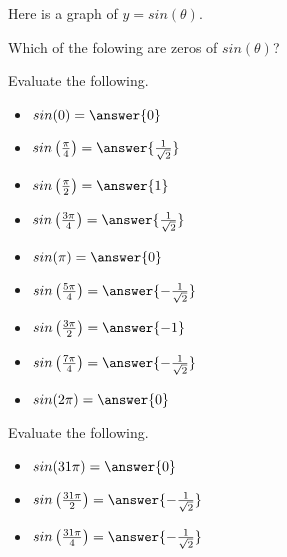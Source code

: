 \documentclass{ximera}
\author{Lee Wayand}
\begin{document}
Here is a graph of $y = sin(\theta)$.
\begin{center}
\end{center}




\begin{exercise} Which of the folowing are zeros of $sin(\theta)$? 

\begin{selectAll}
\choice [correct]{$-3\pi$}
\choice [correct]{$-2\pi$}
\choice [correct]{$-\pi$}
\choice [correct]{$\pi$}
\choice [correct]{$2\pi$}
\choice [correct]{$3\pi$}
\end{selectAll}


\end{exercise}




\begin{exercise} Evaluate the following.

\begin{itemize}
\item $sin(0) = \answer{0}$
\item $sin\left(\frac{\pi}{4}\right) = \answer{\frac{1}{\sqrt{2}}}$
\item $sin\left(\frac{\pi}{2}\right) = \answer{1}$
\item $sin\left(\frac{3\pi}{4}\right) = \answer{\frac{1}{\sqrt{2}}}$
\item $sin(\pi) = \answer{0}$
\item $sin\left(\frac{5\pi}{4}\right) = \answer{-\frac{1}{\sqrt{2}}}$
\item $sin\left(\frac{3\pi}{2}\right) = \answer{-1}$
\item $sin\left(\frac{7\pi}{4}\right) = \answer{-\frac{1}{\sqrt{2}}}$
\item $sin(2\pi) = \answer{0}$
\end{itemize}

\end{exercise}






\begin{exercise} Evaluate the following.

\begin{itemize}
\item $sin(31\pi) = \answer{0}$
\item $sin\left(\frac{31\pi}{2}\right) = \answer{-\frac{1}{\sqrt{2}}}$
\item $sin\left(\frac{31\pi}{4}\right) = \answer{-\frac{1}{\sqrt{2}}}$
\end{itemize}

\end{exercise}
\end{document}
